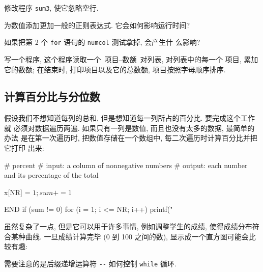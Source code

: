 \begin{exercise}
    修改程序 \verb'sum3', 使它忽略空行.
\end{exercise}
\begin{exercise}
    为数值添加更加一般的正则表达式. 它会如何影响运行时间?
\end{exercise}
\begin{exercise}
    如果把第 2 个 \verb'for' 语句的 \verb'numcol' 测试拿掉, 会产生什
    么影响?
\end{exercise}
\begin{exercise}
    写一个程序, 这个程序读取一个\ 项目--数额\ 对列表, 对列表中的每一个
项目, 累加它的数额; 在结束时, 打印项目以及它的总数额, 项目按照字母顺序排序.
\end{exercise}

\subsection{计算百分比与分位数}
\label{subsec:computing_percentages_and_quantiles}

假设我们不想知道每列的总和, 但是想知道每一列所占的百分比. 要完成这个工作就
必须对数据遍历两遍. 如果只有一列是数值, 而且也没有太多的数据, 最简单的办法
是在第一次遍历时, 把数值存储在一个数组中, 每二次遍历时计算百分比并把它打印
出来:
\begin{awkcode}
     # percent
     #   input:  a column of nonnegative numbers
     #   output: each number and its percentage of the total
     
         { x[NR] = $1; sum += $1 }
     
     END { if (sum != 0)
               for (i = 1; i <= NR; i++)
                   printf("%
         }
\end{awkcode}

虽然复杂了一点, 但是它可以用于许多事情, 例如调整学生的成绩, 使得成绩分布符
合某种曲线. 一旦成绩计算完毕 (0 到 100 之间的数), 显示成一个直方图可能会比
较有趣:
需要注意的是后缀递增运算符 \verb'--' 如何控制 \verb'while' 循环.

